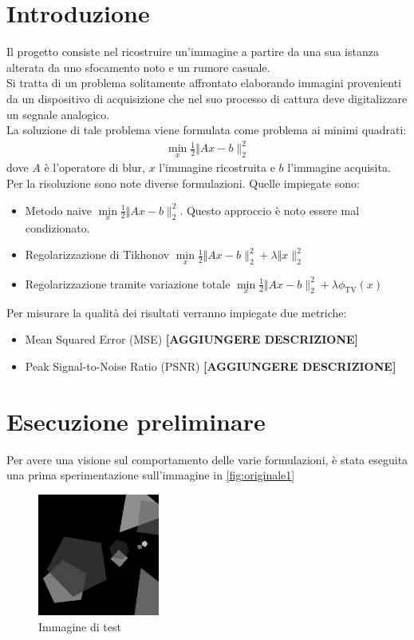 \documentclass[11pt]{article}
\begin{document}
\section{Introduzione}
Il progetto consiste nel ricostruire un'immagine a partire da una sua istanza alterata da uno sfocamento noto e un rumore casuale.\\
Si tratta di un problema solitamente affrontato elaborando immagini provenienti da un dispositivo di acquisizione che nel suo processo di cattura deve digitalizzare un segnale analogico.\\ 
La soluzione di tale problema viene formulata come problema ai minimi quadrati:
\begin{align*}
    \min\limits_{x} \frac{1}{2} \Vert Ax-b \|_{2}^{2}
\end{align*}
dove $A$ è l'operatore di blur, $x$ l'immagine ricostruita e $b$ l'immagine acquisita.\\
Per la risoluzione sono note diverse formulazioni. Quelle impiegate sono:
\begin{itemize}
    \setlength\itemsep{0.05cm}
    \item Metodo naive $\min\limits_{x} \frac{1}{2} \Vert Ax-b \|_{2}^{2}$. Questo approccio è noto essere mal condizionato.
    \item Regolarizzazione di Tikhonov $\min\limits_{x} \frac{1}{2} \Vert Ax-b \|_{2}^{2} + \lambda \Vert x \|_{2}^{2}$
    \item Regolarizzazione tramite variazione totale $\min\limits_{x} \frac{1}{2} \Vert Ax-b \|_{2}^{2} + \lambda \phi_{\text{TV}}(x)$
\end{itemize}
Per misurare la qualità dei risultati verranno impiegate due metriche:
\begin{itemize}
    \setlength\itemsep{0.05cm}
    \item Mean Squared Error (MSE) \textbf{[AGGIUNGERE DESCRIZIONE]}
    \item Peak Signal-to-Noise Ratio (PSNR) \textbf{[AGGIUNGERE DESCRIZIONE]}
\end{itemize}

\newpage
\section{Esecuzione preliminare}
\label{chap:lambda}
Per avere una visione sul comportamento delle varie formulazioni, è stata eseguita una prima sperimentazione sull'immagine in \autoref{fig:originale1}
\begin{figure}[H]
    \centering
    \includegraphics[width=4cm]{esecuzione/originale.png}
    \caption{Immagine di test}
    \label{fig:originale1}
\end{figure}
\end{document}
